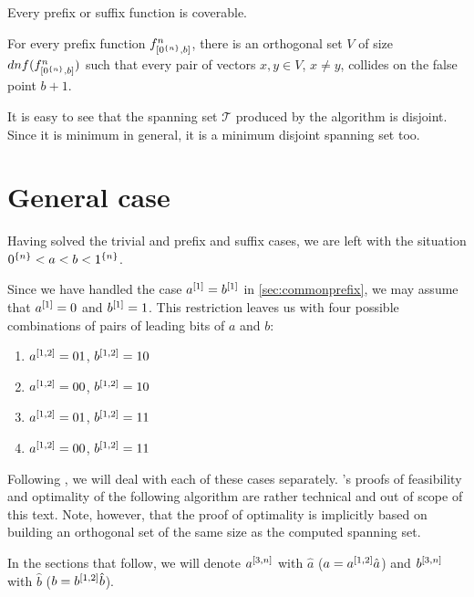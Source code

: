 \begin{corollary}
\label{corollary:prefixsuffixcoverable}
Every prefix or suffix function is coverable.
\end{corollary}

\begin{corollary}
\label{corollary:prefixdependence}
For every prefix function $f^{n}_{[0^{\{n\}}, b]}$,
there is an orthogonal set $V$
of size $dnf(f^{n}_{[0^{\{n\}}, b]})$
such that
every pair of vectors $x,y \in V$, $x \neq y$,
collides on the false point $b+1$.
\end{corollary}

It is easy to see that the spanning set $\mathcal{T}$
produced by the algorithm is disjoint.
Since it is minimum in general,
it is a minimum disjoint spanning set too.

\section{General case}
\label{sec:1intervalgeneral}

Having solved the trivial and prefix and suffix cases,
we are left with the situation
$0^{\{n\}} < a < b < 1^{\{n\}}$.

Since we have handled the case $a^{[1]} = b^{[1]}$
in \cref{sec:commonprefix},
we may assume that $a^{[1]} = 0$ and $b^{[1]} = 1$.
This restriction leaves us with
four possible combinations of pairs
of leading bits of $a$ and $b$:

\begin{enumerate}
\item $a^{[1, 2]} = 01$, $b^{[1, 2]} = 10$
\item $a^{[1, 2]} = 00$, $b^{[1, 2]} = 10$
\item $a^{[1, 2]} = 01$, $b^{[1, 2]} = 11$
\item $a^{[1, 2]} = 00$, $b^{[1, 2]} = 11$
\end{enumerate}

Following \citet{Schieber2005154},
we will deal with each of these cases separately.
\citeauthor{Schieber2005154}'s proofs of feasibility
and optimality of the following
algorithm are rather technical and out of scope
of this text.
Note, however, that the proof of optimality is implicitly
based on building an orthogonal set of the same size
as the computed spanning set.

In the sections that follow,
we will denote $a^{[3, n]}$ with $\hat{a}$
($a = a^{[1, 2]} \hat{a}$)
and $b^{[3, n]}$ with $\hat{b}$
($b = b^{[1, 2]} \hat{b}$).

